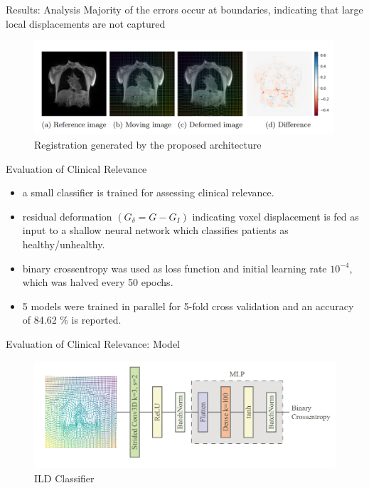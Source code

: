 \documentclass{beamer}
\begin{document}
\begin{frame}{Results: Analysis}
    Majority of the errors occur at boundaries, indicating that large local displacements are not captured
    \begin{figure}
        \centering
        \includegraphics[height=3.5cm]{results.png}
        \caption{Registration generated by the proposed architecture}
        \label{fig:results}
    \end{figure}
\end{frame}

\begin{frame}{Evaluation of Clinical Relevance}
    \begin{itemize}
        \item a small classifier is trained for assessing clinical relevance.
        \item residual deformation $(G_{\delta}=G-G_I)$ indicating voxel displacement is fed as input to a shallow neural network which classifies patients as healthy/unhealthy.
        \item binary crossentropy was used as loss function and initial learning rate $10^{-4}$, which was halved every 50 epochs.
        \item 5 models were trained in parallel for 5-fold cross validation and an accuracy of 84.62 \% is reported.
    \end{itemize}
\end{frame}

\begin{frame}{Evaluation of Clinical Relevance: Model}
    \begin{figure}
        \centering
        \includegraphics[height=4cm]{MLP.png}
        \caption{ILD Classifier}
        \label{fig:MLP}
    \end{figure}
\end{frame}
\end{document}
